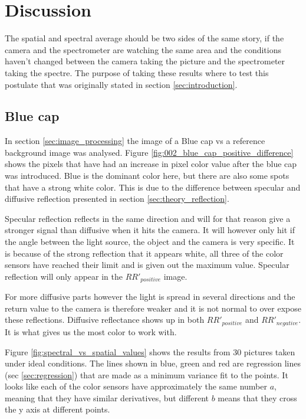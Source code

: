 
\section{Discussion}
The spatial and spectral average should be two sides of the same story, if the camera and the spectrometer are watching the same area and the conditions haven't changed between the camera taking the picture and the spectrometer taking the spectre. The purpose of taking these results where to test this postulate that was originally stated in section \ref{sec:introduction}.

\subsection{Blue cap}
\label{sec:blue_cap_discussion}

In section \ref{sec:image_processing} the image of a Blue cap vs a reference background image was analysed. 
Figure \ref{fig:002_blue_cap_positive_difference} shows the pixels that have had an increase in pixel color value after the blue cap was introduced. Blue is the dominant color here, but there are also some spots that have a strong white color. This is due to the difference between specular and diffusive reflection presented in section \ref{sec:theory_reflection}. 

Specular reflection reflects in the same direction and will for that reason give a stronger signal than diffusive when it hits the camera. It will however only hit if the angle between the light source, the object and the camera is very specific. It is because of the strong reflection that it appears white, all three of the color sensors have reached their limit and is given out the maximum value. Specular reflection will only appear in the $RR'_{positive}$ image. 

For more diffusive parts however the light is spread in several directions and the return value to the camera is therefore weaker and it is not normal to over expose these reflections. Diffusive reflectance shows up in both $RR'_{positive}$ and $RR'_{negative}$. It is what gives us the most color to work with. 


Figure \ref{fig:spectral_vs_spatial_values} shows the results from 30 pictures taken under ideal conditions. The lines shown in blue, green and red are regression lines (sec \ref{sec:regression}) that are made as a minimum variance fit to the points. It looks like each of the color sensors have approximately the same number $a$, meaning that they have similar derivatives, but different $b$ means that they cross the y axis at different points. 

